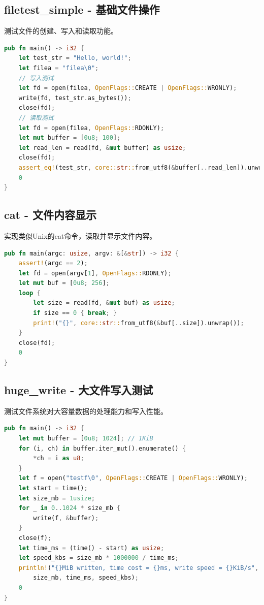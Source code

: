 \subsection{filetest\_simple - 基础文件操作}

测试文件的创建、写入和读取功能。

\begin{lstlisting}[language=Rust]
pub fn main() -> i32 {
    let test_str = "Hello, world!";
    let filea = "filea\0";
    // 写入测试
    let fd = open(filea, OpenFlags::CREATE | OpenFlags::WRONLY);
    write(fd, test_str.as_bytes());
    close(fd);
    // 读取测试
    let fd = open(filea, OpenFlags::RDONLY);
    let mut buffer = [0u8; 100];
    let read_len = read(fd, &mut buffer) as usize;
    close(fd);
    assert_eq!(test_str, core::str::from_utf8(&buffer[..read_len]).unwrap());
    0
}
\end{lstlisting}

\subsection{cat - 文件内容显示}

实现类似Unix的cat命令，读取并显示文件内容。

\begin{lstlisting}[language=Rust]
pub fn main(argc: usize, argv: &[&str]) -> i32 {
    assert!(argc == 2);
    let fd = open(argv[1], OpenFlags::RDONLY);
    let mut buf = [0u8; 256];
    loop {
        let size = read(fd, &mut buf) as usize;
        if size == 0 { break; }
        print!("{}", core::str::from_utf8(&buf[..size]).unwrap());
    }
    close(fd);
    0
}
\end{lstlisting}

\subsection{huge\_write - 大文件写入测试}

测试文件系统对大容量数据的处理能力和写入性能。

\begin{lstlisting}[language=Rust]
pub fn main() -> i32 {
    let mut buffer = [0u8; 1024]; // 1KiB
    for (i, ch) in buffer.iter_mut().enumerate() {
        *ch = i as u8;
    }
    let f = open("testf\0", OpenFlags::CREATE | OpenFlags::WRONLY);
    let start = time();
    let size_mb = 1usize;
    for _ in 0..1024 * size_mb {
        write(f, &buffer);
    }
    close(f);
    let time_ms = (time() - start) as usize;
    let speed_kbs = size_mb * 1000000 / time_ms;
    println!("{}MiB written, time cost = {}ms, write speed = {}KiB/s",
        size_mb, time_ms, speed_kbs);
    0
}
\end{lstlisting}

